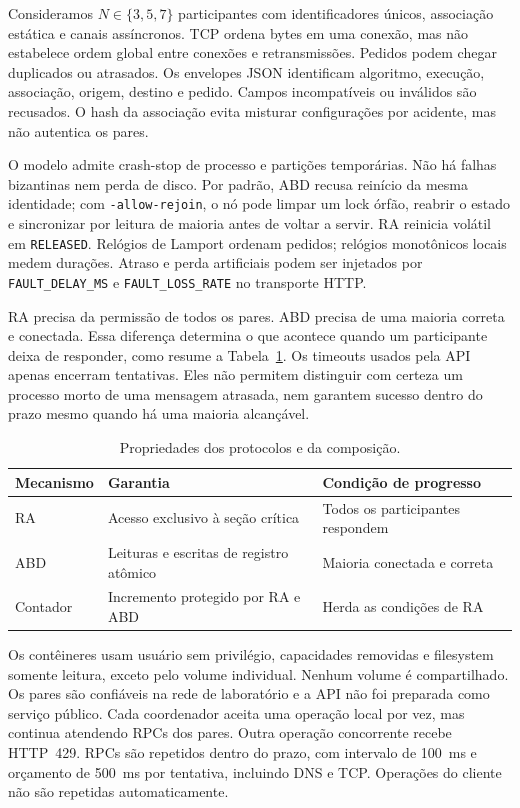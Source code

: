 \documentclass[conference]{IEEEtran}
\begin{document}
Consideramos $N\in\{3,5,7\}$ participantes com identificadores únicos, associação estática e canais assíncronos. TCP ordena bytes em uma conexão, mas não estabelece ordem global entre conexões e retransmissões. Pedidos podem chegar duplicados ou atrasados. Os envelopes JSON identificam algoritmo, execução, associação, origem, destino e pedido. Campos incompatíveis ou inválidos são recusados. O hash da associação evita misturar configurações por acidente, mas não autentica os pares.

O modelo admite crash-stop de processo e partições temporárias. Não há falhas bizantinas nem perda de disco. Por padrão, ABD recusa reinício da mesma identidade; com \texttt{-allow-rejoin}, o nó pode limpar um lock órfão, reabrir o estado e sincronizar por leitura de maioria antes de voltar a servir. RA reinicia volátil em \texttt{RELEASED}. Relógios de Lamport ordenam pedidos; relógios monotônicos locais medem durações. Atraso e perda artificiais podem ser injetados por \texttt{FAULT\_DELAY\_MS} e \texttt{FAULT\_LOSS\_RATE} no transporte HTTP.

RA precisa da permissão de todos os pares. ABD precisa de uma maioria correta e conectada. Essa diferença determina o que acontece quando um participante deixa de responder, como resume a Tabela~\ref{tab:modelo}. Os timeouts usados pela API apenas encerram tentativas. Eles não permitem distinguir com certeza um processo morto de uma mensagem atrasada, nem garantem sucesso dentro do prazo mesmo quando há uma maioria alcançável.

\begin{table}[!t]
\caption{Propriedades dos protocolos e da composição.}
\label{tab:modelo}
\centering
\footnotesize
\begin{tabular}{@{}l>{\raggedright\arraybackslash}p{}>{\raggedright\arraybackslash}p{}@{}}
\toprule
Mecanismo & Garantia & Condição de progresso \\
\midrule
RA & Acesso exclusivo à seção crítica & Todos os participantes respondem \\
ABD & Leituras e escritas de registro atômico & Maioria conectada e correta \\
Contador & Incremento protegido por RA e ABD & Herda as condições de RA \\
\bottomrule
\end{tabular}
\end{table}

Os contêineres usam usuário sem privilégio, capacidades removidas e filesystem somente leitura, exceto pelo volume individual. Nenhum volume é compartilhado. Os pares são confiáveis na rede de laboratório e a API não foi preparada como serviço público. Cada coordenador aceita uma operação local por vez, mas continua atendendo RPCs dos pares. Outra operação concorrente recebe HTTP~429. RPCs são repetidos dentro do prazo, com intervalo de 100~ms e orçamento de 500~ms por tentativa, incluindo DNS e TCP. Operações do cliente não são repetidas automaticamente.
\end{document}
